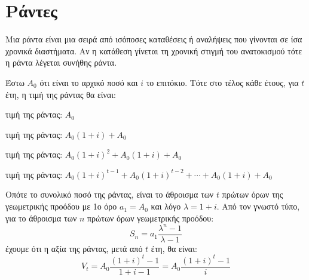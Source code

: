 \chapter*{Ράντες}

\begin{dfn}
  Μια \textcolor{Col1}{ράντα} είναι μια σειρά από ισόποσες καταθέσεις ή αναλήψεις που 
  γίνονται σε ίσα χρονικά διαστήματα. Αν η κατάθεση γίνεται τη χρονική στιγμή του 
  ανατοκισμού τότε η ράντα λέγεται \textcolor{Col1}{συνήθης ράντα}.
\end{dfn}
Έστω $ A_{0} $ ότι είναι το αρχικό ποσό και $i$ το επιτόκιο. Τότε στο τέλος κάθε έτους, 
για $ t $ έτη, η τιμή της ράντας θα είναι:
\begin{description}[widest=[3o Έτος,labelsep*=1ex,leftmargin=*]
  \item [1ο έτος:] τιμή της ράντας: $ A_{0} $
  \item [2ο έτος:] τιμή της ράντας: $ A_{0}(1+i) + A_{0} $
  \item [3ο έτος:] τιμή της ράντας: $ A_{0}(1+i)^{2} + A_{0}(1+i) + A_{0} $
  \item [$t$ έτος:] τιμή της ράντας: $ A_{0}(1+i)^{t-1} + A_{0}(1+i)^{t-2} + \cdots + 
    A_{0}(1+i) + A_{0} $
\end{description}
Οπότε το συνολικό ποσό της ράντας, είναι το άθροισμα των $t$ πρώτων όρων της 
γεωμετρικής προόδου με 1ο όρο $ a_{1}=A_{0} $ και λόγο $ \lambda = 1+i $. Από τον 
γνωστό τύπο, για το άθροισμα των $n$ πρώτων όρων γεωμετρικής προόδου:
\[
  S_{n} = a_{1} \frac{\lambda ^{n}-1}{\lambda -1} 
\] 
έχουμε ότι η αξία της ράντας, μετά από $t$ έτη,  θα είναι:
\[
  V_{t} = A_{0} \frac{(1+i)^{t}-1}{1+i-1} = A_{0} \frac{(1+i)^{t}-1}{i}
\] 

